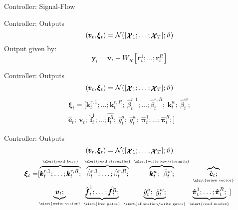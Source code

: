 \documentclass{beamer}
\newcommand{\xx}{\pmb{\raisebox{-1.5pt}{$\mathcal{X}$}}}
\newcommand{\hh}{\pmb{h}}
\begin{document}
\begin{frame}{Controller: Signal-Flow}
\begin{figure}
	\end{figure}
\end{frame}

\begin{frame}{Controller: Outputs}
	\vspace*{\fill}
	\[
	(\pmb{v}_t,\pmb{\xi}_t)=\mathcal{N}([\xx_1;\dots;\xx_T];\vartheta)
	\]
	\pause
	Output given by:
	\[
	\pmb{y}_t = \pmb{v}_t + W_R[\pmb{r}_t^1;\dots;\pmb{r}_t^R] \tag{hello}
	\]
\end{frame}

\begin{frame}{Controller: Outputs}
	\[
	(\pmb{v}_t,\pmb{\xi}_t)=\mathcal{N}([\xx_1;\dots;\xx_T];\vartheta)
	\]
	\vspace{5pt}
	\pause
	\begin{equation*}
	\begin{split}
	\pmb\xi_t = [ \pmb{k}_t^{r,1};\dots;\pmb{k}_t^{r,R};\ 
				\hat{\beta}_t^{r,1};\dots;\hat{\beta}_t^{r,R};\ 
				\pmb{k}_t^w;\ \hat{\beta}_t^w; \\
				\hat{\pmb{e}}_t;\
				\pmb{v}_t;\ \hat{\pmb{f}}_t^1;\dots;\hat{\pmb{f}_t^R};\ 
				\hat{g}_t^a;\ \hat{g}_t^w;\ \hat{\pmb{\pi}}_t^1;\dots;\hat{\pmb{\pi}}_t^R;]					
	\end{split}
	\end{equation*}
\end{frame}

\begin{frame}{Controller: Outputs}
	\[
	(\pmb{v}_t,\pmb{\xi}_t)=\mathcal{N}([\xx_1;\dots;\xx_T];\vartheta)
	\]
	\vspace{5pt}
	\begin{equation*}
	\begin{split}
	\pmb\xi_t = &[\overbrace{\pmb{k}_t^{r,1};\dots;\pmb{k}_t^{r,R};}^\text{\tiny\alert{read keys}}\
				\overbrace{\hat{\beta}_t^{r,1};\dots;\hat{\beta}_t^{r,R};}^\text{\tiny\alert{read strengths}}\
				\overbrace{\pmb{k}_t^w;\ \hat{\beta}_t^w;}^\text{\tiny\alert{write key/strength}} \
				\overbrace{\hat{\pmb{e}}_t;}_\text{\tiny\alert{erase vector}} \\
				&\underbrace{\pmb{v}_t;}_\text{\tiny\alert{write vector}} \
				\underbrace{\hat{\pmb{f}}_t^1;\dots;\hat{\pmb{f}_t^R};}_\text{\tiny\alert{free gates}} \
				\underbrace{\hat{g}_t^a;\ \hat{g}_t^w;}_\text{\tiny\alert{allocation/write gates}}\
				\underbrace{\hat{\pmb{\pi}}_t^1;\dots;\hat{\pmb{\pi}}_t^R;}_\text{\tiny\alert{read modes}}]
	\end{split}
	\end{equation*}
\end{frame}
\end{document}
